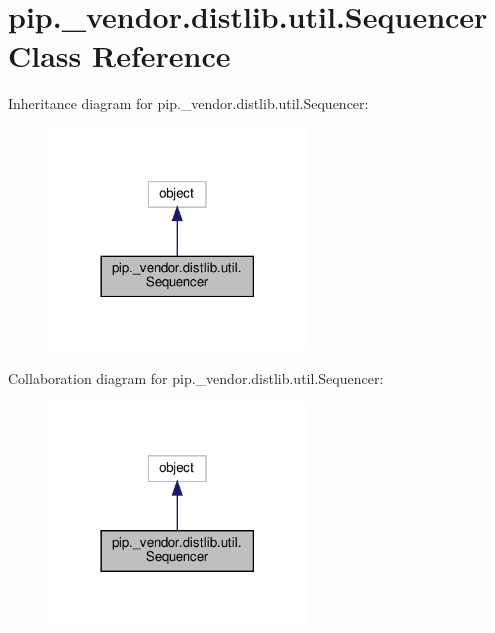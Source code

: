 \hypertarget{classpip_1_1__vendor_1_1distlib_1_1util_1_1Sequencer}{}\section{pip.\+\_\+vendor.\+distlib.\+util.\+Sequencer Class Reference}
\label{classpip_1_1__vendor_1_1distlib_1_1util_1_1Sequencer}


Inheritance diagram for pip.\+\_\+vendor.\+distlib.\+util.\+Sequencer\+:
\nopagebreak
\begin{figure}[H]
\begin{center}
\leavevmode
\includegraphics[width=194pt]{classpip_1_1__vendor_1_1distlib_1_1util_1_1Sequencer__inherit__graph}
\end{center}
\end{figure}


Collaboration diagram for pip.\+\_\+vendor.\+distlib.\+util.\+Sequencer\+:
\nopagebreak
\begin{figure}[H]
\begin{center}
\leavevmode
\includegraphics[width=194pt]{classpip_1_1__vendor_1_1distlib_1_1util_1_1Sequencer__coll__graph}
\end{center}
\end{figure}
